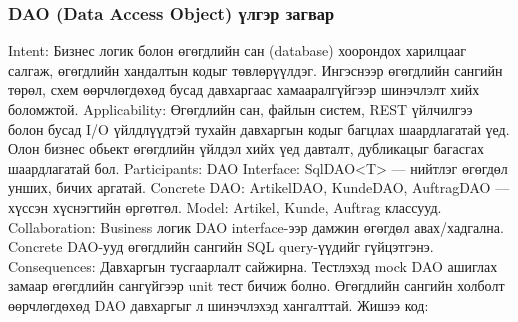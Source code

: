 



\subsubsection{DAO (Data Access Object) үлгэр загвар}
Intent: Бизнес логик болон өгөгдлийн сан (database) хоорондох харилцааг салгаж, өгөгдлийн хандалтын кодыг төвлөрүүлдэг. Ингэснээр өгөгдлийн сангийн төрөл, схем өөрчлөгдөхөд бусад давхаргаас хамааралгүйгээр шинэчлэлт хийх боломжтой.
Applicability:
Өгөгдлийн сан, файлын систем, REST үйлчилгээ болон бусад I/O үйлдлүүдтэй тухайн давхаргын кодыг багцлах шаардлагатай үед.
Олон бизнес обьект өгөгдлийн үйлдэл хийх үед давталт, дубликацыг багасгах шаардлагатай бол.
Participants:
DAO Interface: SqlDAO<T> — нийтлэг өгөгдөл унших, бичих аргатай.
Concrete DAO: ArtikelDAO, KundeDAO, AuftragDAO — хүссэн хүснэгтийн өргөтгөл.
Model: Artikel, Kunde, Auftrag классууд.
Collaboration:
Business логик DAO interface-ээр дамжин өгөгдөл авах/хадгална.
Concrete DAO-ууд өгөгдлийн сангийн SQL query-үүдийг гүйцэтгэнэ.
Consequences:
Давхаргын тусгаарлалт сайжирна.
Тестлэхэд mock DAO ашиглах замаар өгөгдлийн сангүйгээр unit тест бичиж болно.
Өгөгдлийн сангийн холболт өөрчлөгдөхөд DAO давхаргыг л шинэчлэхэд хангалттай.
Жишээ код:

\begin{lstlisting}
\end{lstlisting}